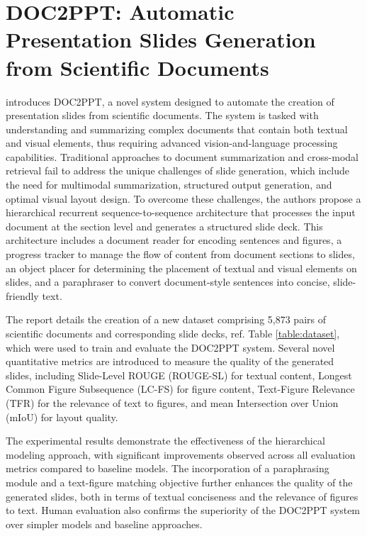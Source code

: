 \section{DOC2PPT: Automatic Presentation Slides Generation from Scientific Documents}

\citet{Fu:2022:AAAI} introduces DOC2PPT, a novel system designed to automate the creation of presentation slides from scientific documents. The system is tasked with understanding and summarizing complex documents that contain both textual and visual elements, thus requiring advanced vision-and-language processing capabilities. Traditional approaches to document summarization and cross-modal retrieval fail to address the unique challenges of slide generation, which include the need for multimodal summarization, structured output generation, and optimal visual layout design. To overcome these challenges, the authors propose a hierarchical recurrent sequence-to-sequence architecture that processes the input document at the section level and generates a structured slide deck. This architecture includes a document reader for encoding sentences and figures, a progress tracker to manage the flow of content from document sections to slides, an object placer for determining the placement of textual and visual elements on slides, and a paraphraser to convert document-style sentences into concise, slide-friendly text.

The report details the creation of a new dataset comprising 5,873 pairs of scientific documents and corresponding slide decks, ref. Table \ref{table:dataset}, which were used to train and evaluate the DOC2PPT system. Several novel quantitative metrics are introduced to measure the quality of the generated slides, including Slide-Level ROUGE (ROUGE-SL) for textual content, Longest Common Figure Subsequence (LC-FS) for figure content, Text-Figure Relevance (TFR) for the relevance of text to figures, and mean Intersection over Union (mIoU) for layout quality.

The experimental results demonstrate the effectiveness of the hierarchical modeling approach, with significant improvements observed across all evaluation metrics compared to baseline models. The incorporation of a paraphrasing module and a text-figure matching objective further enhances the quality of the generated slides, both in terms of textual conciseness and the relevance of figures to text. Human evaluation also confirms the superiority of the DOC2PPT system over simpler models and baseline approaches.

